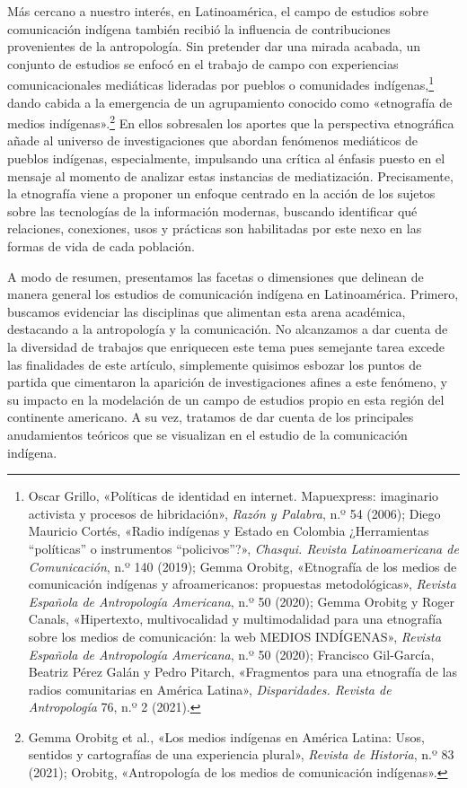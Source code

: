 \documentclass{tufte-handout}
\begin{document}
Más cercano a nuestro interés, en Latinoamérica, el campo de estudios
sobre comunicación indígena también recibió la influencia de
contribuciones provenientes de la antropología. Sin pretender dar una
mirada acabada, un conjunto de estudios se enfocó en el trabajo de campo
con experiencias comunicacionales mediáticas lideradas por pueblos o
comunidades indígenas,\footnote{Oscar Grillo, «Políticas de identidad en
  internet. Mapuexpress: imaginario activista y procesos de
  hibridación», \emph{Razón y Palabra}, n.º 54 (2006); Diego Mauricio
  Cortés, «Radio indígenas y Estado en Colombia ¿Herramientas
  ``políticas'' o instrumentos ``policivos''?», \emph{Chasqui. Revista
  Latinoamericana de Comunicación}, n.º 140 (2019); Gemma Orobitg,
  «Etnografía de los medios de comunicación indígenas y afroamericanos:
  propuestas metodológicas», \emph{Revista Española de Antropología
  Americana}, n.º 50 (2020); Gemma Orobitg y Roger Canals, «Hipertexto,
  multivocalidad y multimodalidad para una etnografía sobre los medios
  de comunicación: la web MEDIOS INDÍGENAS», \emph{Revista Española de
  Antropología Americana}, n.º 50 (2020); Francisco Gil-García, Beatriz
  Pérez Galán y Pedro Pitarch, «Fragmentos para una etnografía de las
  radios comunitarias en América Latina», \emph{Disparidades. Revista de
  Antropología} 76, n.º 2 (2021).} dando cabida a la emergencia de un
agrupamiento conocido como «etnografía de medios indígenas».\footnote{Gemma
  Orobitg et al., «Los medios indígenas en América Latina: Usos,
  sentidos y cartografías de una experiencia plural», \emph{Revista de
  Historia}, n.º 83 (2021); Orobitg, «Antropología de los medios de
  comunicación indígenas».} En ellos sobresalen los aportes que la
perspectiva etnográfica añade al universo de investigaciones que abordan
fenómenos mediáticos de pueblos indígenas, especialmente, impulsando una
crítica al énfasis puesto en el mensaje al momento de analizar estas
instancias de mediatización. Precisamente, la etnografía viene a
proponer un enfoque centrado en la acción de los sujetos sobre las
tecnologías de la información modernas, buscando identificar qué
relaciones, conexiones, usos y prácticas son habilitadas por este nexo
en las formas de vida de cada población.

A modo de resumen, presentamos las facetas o dimensiones que delinean de
manera general los estudios de comunicación indígena en Latinoamérica.
Primero, buscamos evidenciar las disciplinas que alimentan esta arena
académica, destacando a la antropología y la comunicación. No alcanzamos
a dar cuenta de la diversidad de trabajos que enriquecen este tema pues
semejante tarea excede las finalidades de este artículo, simplemente
quisimos esbozar los puntos de partida que cimentaron la aparición de
investigaciones afines a este fenómeno, y su impacto en la modelación de
un campo de estudios propio en esta región del continente americano. A
su vez, tratamos de dar cuenta de los principales anudamientos teóricos
que se visualizan en el estudio de la comunicación indígena.
\end{document}
